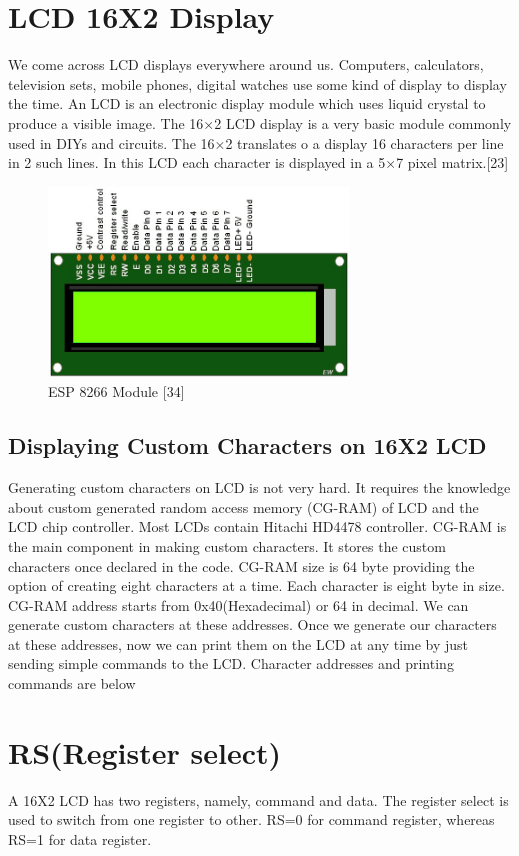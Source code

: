 \documentclass[twoside,a4paper,16pt]{book}
\begin{document}
{{\begin{itemize}
\end{itemize}
\section{LCD 16X2 Display }


We come across LCD displays everywhere around us. Computers, calculators, television sets, mobile phones, digital watches use some kind of display to display the time. An LCD is an electronic display module which uses liquid crystal to produce a visible image. The 16×2 LCD display is a very basic module commonly used in DIYs and circuits. The 16×2 translates o a display 16 characters per line in 2 such lines. In this LCD each character is displayed in a 5×7 pixel matrix.[23]
\begin{figure}[ht!]
	\begin{center}
		\includegraphics[width=8.0cm]{17.png}
		\caption{ESP 8266 Module [34]}
	\end{center}
\end{figure}
\subsection{Displaying Custom Characters on 16X2 LCD}
Generating custom characters on LCD is not very hard. It requires the knowledge about custom generated random access memory (CG-RAM) of LCD and the LCD chip controller. Most LCDs contain Hitachi HD4478 controller. CG-RAM is the main component in making custom characters. It stores the custom characters once declared in the code. CG-RAM size is 64 byte providing the option of creating eight characters at a time. Each character is eight byte in size.
CG-RAM address starts from 0x40(Hexadecimal) or 64 in decimal. We can generate custom characters at these addresses. Once we generate our characters at these addresses, now we can print them on the LCD at any time by just sending simple commands to the LCD. Character addresses and printing commands are below
\section*{RS(Register select)}
A 16X2 LCD has two registers, namely, command and data. The register select is used to switch from one register to other. RS=0 for command register, whereas RS=1 for data register.

}}
\end{document}
